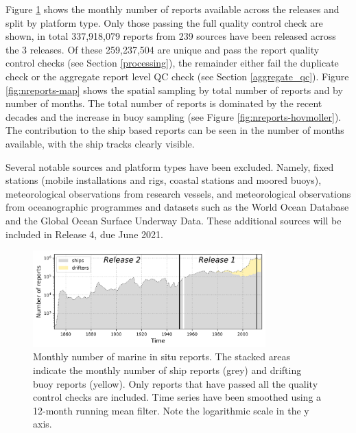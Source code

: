 Figure \ref{fig:nreports-ts} shows the monthly number of reports available across the releases and split by platform type. 
Only those passing the full quality control check are shown, in total 337,918,079 reports from 239 sources have been released across the 3 releases.
Of these 259,237,504 are unique and pass the report quality control checks (see Section \ref{processing}), the remainder either fail the duplicate check or the aggregate report level QC check (see Section \ref{aggregate_qc}).
Figure \ref{fig:nreports-map} shows the spatial sampling by total number of reports and by number of months. 
The total number of reports is dominated by the recent decades and the increase in buoy sampling (see Figure \ref{fig:nreports-hovmoller}). 
The contribution to the ship based reports can be seen in the number of months available, with the ship tracks clearly visible.

Several notable sources and platform types have been excluded.
Namely, fixed stations (mobile installations and rigs, coastal stations and moored buoys), meteorological observations from research vessels, and meteorological observations from oceanographic programmes and datasets such as the World Ocean Database and the Global Ocean Surface Underway Data. 
These additional sources will be included in Release 4, due June 2021.

\begin{figure} [h]
    \centering
    \includegraphics[width=0.8\textwidth]{resources/nreports-ts.png}
    \caption{Monthly number of marine in situ reports. The stacked areas indicate the monthly number of ship reports (grey) and drifting buoy reports (yellow). Only reports that have passed all the quality control checks are included. Time series have been smoothed using a 12-month running mean filter. Note the logarithmic scale in the y axis.}
    \label{fig:nreports-ts}
\end{figure}

